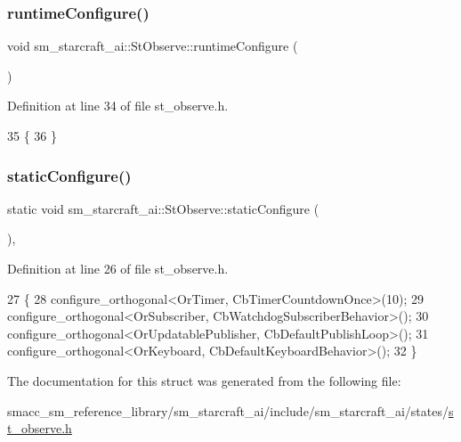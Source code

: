\subsubsection{\texorpdfstring{runtime\+Configure()}{runtimeConfigure()}}
{\footnotesize\ttfamily void sm\+\_\+starcraft\+\_\+ai\+::\+St\+Observe\+::runtime\+Configure (\begin{DoxyParamCaption}{ }\end{DoxyParamCaption})\hspace{0.3cm}{\ttfamily [inline]}}



Definition at line 34 of file st\+\_\+observe.\+h.


\begin{DoxyCode}
35     \{
36     \}
\end{DoxyCode}
\mbox{\label{structsm__starcraft__ai_1_1StObserve_a9aa04128ad0fb18454d9ea2db4edca48}} 
\subsubsection{\texorpdfstring{static\+Configure()}{staticConfigure()}}
{\footnotesize\ttfamily static void sm\+\_\+starcraft\+\_\+ai\+::\+St\+Observe\+::static\+Configure (\begin{DoxyParamCaption}{ }\end{DoxyParamCaption})\hspace{0.3cm}{\ttfamily [inline]}, {\ttfamily [static]}}



Definition at line 26 of file st\+\_\+observe.\+h.


\begin{DoxyCode}
27     \{
28         configure\_orthogonal<OrTimer, CbTimerCountdownOnce>(10);
29         configure\_orthogonal<OrSubscriber, CbWatchdogSubscriberBehavior>();
30         configure\_orthogonal<OrUpdatablePublisher, CbDefaultPublishLoop>();
31         configure\_orthogonal<OrKeyboard, CbDefaultKeyboardBehavior>();
32     \}
\end{DoxyCode}


The documentation for this struct was generated from the following file\+:\begin{DoxyCompactItemize}
\item 
smacc\+\_\+sm\+\_\+reference\+\_\+library/sm\+\_\+starcraft\+\_\+ai/include/sm\+\_\+starcraft\+\_\+ai/states/\hyperlink{sm__starcraft__ai_2include_2sm__starcraft__ai_2states_2st__observe_8h}{st\+\_\+observe.\+h}\end{DoxyCompactItemize}
